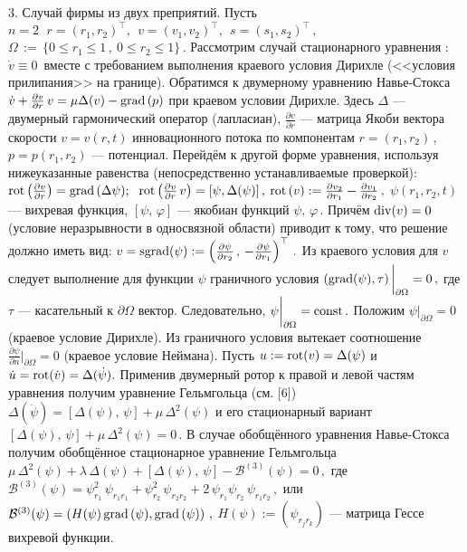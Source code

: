3. Случай фирмы из двух преприятий. Пусть
 $
n=2\, \ \ r=\left(r_1, r_2\right)^\top, \ \ v=\left(v_1,
v_2\right)^\top, \ \ s=\left(s_1,s_2\right)^\top\,,
 $
 $
\Omega\,:= \,  \{0 \leqslant r_1 \leqslant 1\,, \ 0 \leqslant r_2 \leqslant 1\}\,.
 $
Рассмотрим случай стационарного уравнения :\ $\dot v \equiv 0$\,
вместе с  требованием выполнения краевого условия Дирихле (<<условия
прилипания>> на границе). Обратимся к двумерному уравнению
Навье-Стокса
  $
\dot v + \frac{\partial v}{\partial r}\,v = \mu\Delta (v) - {\rm
grad}\,(p)
  $
при краевом условии Дирихле. Здесь $\Delta$ --- двумерный
гармонический оператор (лапласиан), $\frac{\partial v}{\partial r}$
--- матрица Якоби вектора скорости $v=v(r,t)$ инновационного
потока по компонентам $r=(r_1,r_2)$\,, \ $p=p(r_1,r_2)$ ---
потенциал. Перейдём к другой форме уравнения, используя
нижеуказанные равенства (непосредственно устанавливаемые проверкой):
  $
{\rm rot}\left(\frac{\partial v}{\partial r}\right)={\rm
grad}\,(\Delta \psi);
 $
 $ \ {\rm rot}\left(\frac{\partial
v}{\partial r}\, v\right)=[\psi,\Delta (\psi)]\,,
  $
$ {\rm rot}\,(v) := \frac{\partial v_2}{\partial r_1}-\frac{\partial
v_1}{\partial r_2}\,, $ $\psi (r_1,r_2,t)$ --- вихревая функция,
$[\psi,\,\varphi]$ --- якобиан функций $\psi,\,\varphi$\,. Причём $
{\rm div}(v) =0 $ (условие неразрывности в односвязной области)
приводит к тому, что решение должно иметь вид:
 $
v = {\rm sgrad}(\psi) := \left(\frac{\partial\psi}{\partial
r_2}\,,\,-\frac{\partial\psi}{\partial r_1}\right)^\top\,.
 $
Из краевого условия для $v$ следует выполнение для функции $\psi$
граничного условия
  $
({\rm grad}(\psi),\tau)\,\bigg |_{\partial \Omega} = 0\,,
  $
где $\tau$ --- касательный к $\partial \Omega$ вектор.
Следовательно, $ \psi\bigg |_{\partial \Omega} = {\rm const}\,.$
Положим
 $
\psi\bigg |_{\partial \Omega} = 0\,
 $
(краевое условие Дирихле). Из граничного условия вытекает
соотношение
 $
\frac{\partial \psi}{\partial n}\bigg |_{\partial \Omega} = 0
  $
(краевое условие Неймана). Пусть $ u := {\rm rot}(v) = \Delta(\psi)$
и $ \dot u = {\rm rot}(\dot{v})=\Delta(\dot\psi). $ Применив
двумерный ротор к правой и левой частям уравнения получим уравнение
Гельмгольца (см. [6])
 $
\Delta(\dot\psi) = [\Delta(\psi),\,\psi] + \mu\,\Delta^2(\psi)
 $
и его стационарный вариант
 $
[\Delta(\psi),\,\psi] + \mu\,\Delta^2(\psi) = 0 \,.
 $
В случае обобщённого уравнения Навье-Стокса  получим обобщённое
стационарное уравнение Гельмгольца
 $
\mu\,\Delta^2(\psi) + \lambda\,\Delta(\psi) + [\Delta(\psi),\,\psi]
- \mathcal{B}^{(3)}(\psi) = 0 \,,
 $
где
 $
\mathcal{B}^{(3)}(\psi) = \psi_{r_1}^2\,\psi_{r_1r_1}+
\psi_{r_2}^2\,\psi_{r_2r_2}+
2\,\psi_{r_1}\psi_{r_2}\,\psi_{r_1r_2}\,,
 $ или
 $
\mathcal{B}^{(3)}(\psi)= \left(H(\psi)\,{\rm grad}\,(\psi) , {\rm
grad}\,(\psi)\right)\,,
 $
$H(\psi):= (\psi_{r_jr_k})$ --- матрица Гессе вихревой функции.


